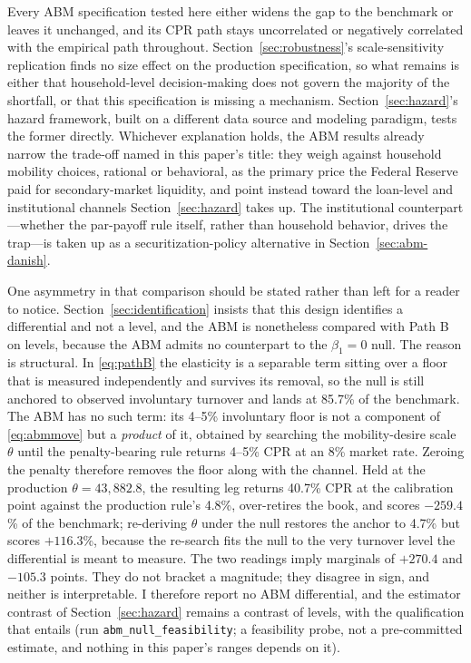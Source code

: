 \documentclass[12pt]{article}
\begin{document}
Every ABM specification tested here either widens the gap to the benchmark or leaves it unchanged, and its CPR path stays uncorrelated or negatively correlated with the empirical path throughout. Section~\ref{sec:robustness}'s scale-sensitivity replication finds no size effect on the production specification, so what remains is either that household-level decision-making does not govern the majority of the shortfall, or that this specification is missing a mechanism. Section~\ref{sec:hazard}'s hazard framework, built on a different data source and modeling paradigm, tests the former directly. Whichever explanation holds, the ABM results already narrow the trade-off named in this paper's title: they weigh against household mobility choices, rational or behavioral, as the primary price the Federal Reserve paid for secondary-market liquidity, and point instead toward the loan-level and institutional channels Section~\ref{sec:hazard} takes up. The institutional counterpart---whether the par-payoff rule itself, rather than household behavior, drives the trap---is taken up as a securitization-policy alternative in Section~\ref{sec:abm-danish}.

One asymmetry in that comparison should be stated rather than left for a reader to notice. Section~\ref{sec:identification} insists that this design identifies a differential and not a level, and the ABM is nonetheless compared with Path B on levels, because the ABM admits no counterpart to the $\beta_1 = 0$ null. The reason is structural. In \eqref{eq:pathB} the elasticity is a separable term sitting over a floor that is measured independently and survives its removal, so the null is still anchored to observed involuntary turnover and lands at 85.7\% of the benchmark. The ABM has no such term: its 4--5\% involuntary floor is not a component of \eqref{eq:abmmove} but a \emph{product} of it, obtained by searching the mobility-desire scale $\theta$ until the penalty-bearing rule returns 4--5\% CPR at an 8\% market rate. Zeroing the penalty therefore removes the floor along with the channel. Held at the production $\theta = 43{,}882.8$, the resulting leg returns 40.7\% CPR at the calibration point against the production rule's 4.8\%, over-retires the book, and scores $-259.4$\% of the benchmark; re-deriving $\theta$ under the null restores the anchor to 4.7\% but scores $+116.3$\%, because the re-search fits the null to the very turnover level the differential is meant to measure. The two readings imply marginals of $+270.4$ and $-105.3$ points. They do not bracket a magnitude; they disagree in sign, and neither is interpretable. I therefore report no ABM differential, and the estimator contrast of Section~\ref{sec:hazard} remains a contrast of levels, with the qualification that entails (run \texttt{abm\_null\_feasibility}; a feasibility probe, not a pre-committed estimate, and nothing in this paper's ranges depends on it).
\end{document}
